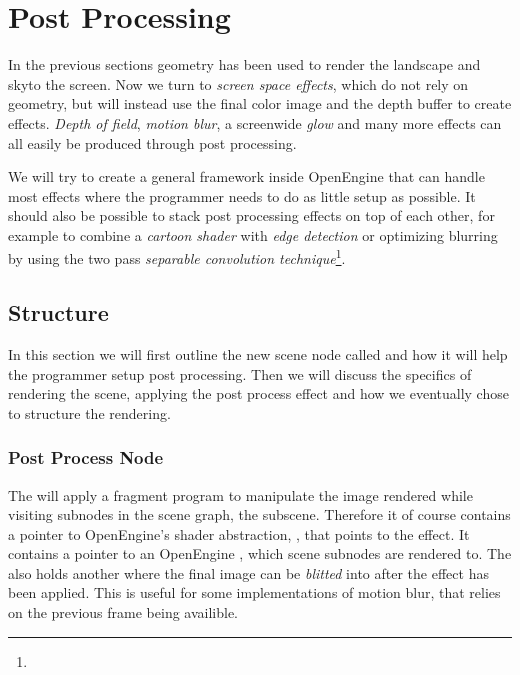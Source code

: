 \chapter{Post Processing}
\label{chap:pp}


In the previous sections geometry has been used to render the
landscape and skyto the screen. Now we turn to \emph{screen space
  effects}, which do not rely on geometry, but will instead use the
final color image and the depth buffer to create effects. \emph{Depth
  of field}, \emph{motion blur}, a screenwide \emph{glow} and many
more effects can all easily be produced through post processing.


We will try to create a general framework inside OpenEngine that can
handle most effects where the programmer needs to do as little setup
as possible. It should also be possible to stack post processing
effects on top of each other, for example to combine a \emph{cartoon
  shader} with \emph{edge detection} or optimizing blurring by using
the two pass \emph{separable convolution
  technique}\footnote{{}}.

\section{Structure}

In this section we will first outline the new scene node called
 and how it will help the programmer setup post
processing. Then we will discuss the specifics of rendering the scene,
applying the post process effect and how we eventually chose to
structure the rendering.

\subsection*{Post Process Node}

The  will apply a fragment program to
manipulate the image rendered while visiting subnodes in the scene
graph, the subscene. Therefore it of course contains a pointer to
OpenEngine's shader abstraction, , that points
to the effect. It contains a pointer to an OpenEngine
, which scene subnodes are rendered to. The
 also holds another  where
the final image can be \emph{blitted} into after the effect has been
applied. This is useful for some implementations of motion blur, that
relies on the previous frame being availible.

